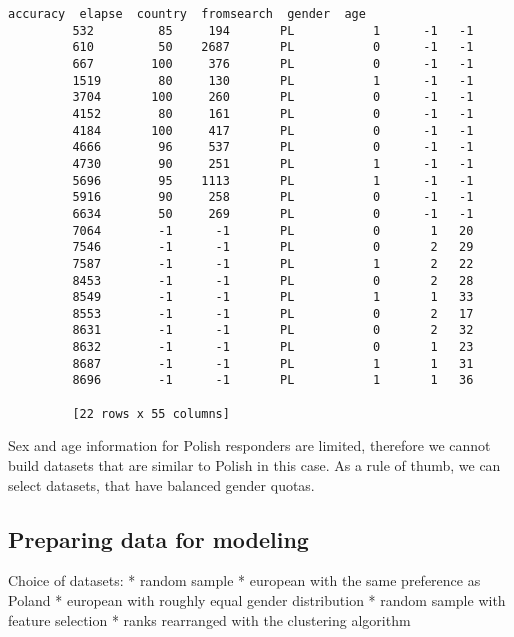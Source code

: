\documentclass[11pt]{article}
\begin{document}
\begin{Verbatim}[commandchars=\\\{\}]
               accuracy  elapse  country  fromsearch  gender  age  
         532         85     194       PL           1      -1   -1  
         610         50    2687       PL           0      -1   -1  
         667        100     376       PL           0      -1   -1  
         1519        80     130       PL           1      -1   -1  
         3704       100     260       PL           0      -1   -1  
         4152        80     161       PL           0      -1   -1  
         4184       100     417       PL           0      -1   -1  
         4666        96     537       PL           0      -1   -1  
         4730        90     251       PL           1      -1   -1  
         5696        95    1113       PL           1      -1   -1  
         5916        90     258       PL           0      -1   -1  
         6634        50     269       PL           0      -1   -1  
         7064        -1      -1       PL           0       1   20  
         7546        -1      -1       PL           0       2   29  
         7587        -1      -1       PL           1       2   22  
         8453        -1      -1       PL           0       2   28  
         8549        -1      -1       PL           1       1   33  
         8553        -1      -1       PL           0       2   17  
         8631        -1      -1       PL           0       2   32  
         8632        -1      -1       PL           0       1   23  
         8687        -1      -1       PL           1       1   31  
         8696        -1      -1       PL           1       1   36  
         
         [22 rows x 55 columns]
\end{Verbatim}
        
    Sex and age information for Polish responders are limited, therefore we
cannot build datasets that are similar to Polish in this case. As a rule
of thumb, we can select datasets, that have balanced gender quotas.

    \subsection{Preparing data for
modeling}\label{preparing-data-for-modeling}

    Choice of datasets: * random sample * european with the same preference
as Poland * european with roughly equal gender distribution * random
sample with feature selection * ranks rearranged with the clustering
algorithm
\end{document}
